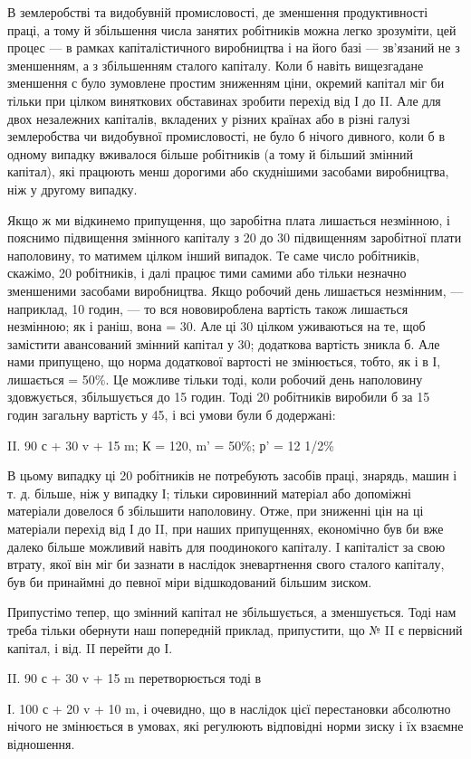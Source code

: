 В землеробстві та видобувній промисловості, де зменшення
продуктивності праці, а тому й збільшення числа занятих робітників
можна легко зрозуміти, цей процес — в рамках капіталістичного
виробництва і на його базі — зв’язаний не з зменшенням,
а з збільшенням сталого капіталу. Коли б навіть вищезгадане
зменшення с було зумовлене простим зниженням ціни,
окремий капітал міг би тільки при цілком виняткових обставинах
зробити перехід від І до II. Але для двох незалежних капіталів,
вкладених у різних країнах або в різні галузі землеробства чи
видобувної промисловості, не було б нічого дивного, коли б
в одному випадку вживалося більше робітників (а тому й більший
змінний капітал), які працюють менш дорогими або скуднішими
засобами виробництва, ніж у другому випадку.

Якщо ж ми відкинемо припущення, що заробітна плата лишається
незмінною, і пояснимо підвищення змінного капіталу
з 20 до 30 підвищенням заробітної плати наполовину, то матимем
цілком інший випадок. Те саме число робітників, скажімо,
20 робітників, і далі працює тими самими або тільки незначно
зменшеними засобами виробництва. Якщо робочий день лишається
незмінним, — наприклад, 10 годин, — то вся нововироблена
вартість також лишається незмінною; як і раніш, вона = 30.
Але ці 30 цілком уживаються на те, щоб замістити авансований
змінний капітал у 30; додаткова вартість зникла б. Але нами
припущено, що норма додаткової вартості не змінюється, тобто,
як і в І, лишається = 50\%. Це можливе тільки тоді, коли робочий
день наполовину здовжується, збільшується до 15 годин.
Тоді 20 робітників виробили б за 15 годин загальну вартість
у 45, і всі умови були б додержані:

II. 90 с + 30 v + 15 m; К = 120, m' = 50\%; р' = 12 1/2\%

В цьому випадку ці 20 робітників не потребують засобів
праці, знарядь, машин і т. д. більше, ніж у випадку І; тільки
сировинний матеріал або допоміжні матеріали довелося б збільшити
наполовину. Отже, при зниженні цін на ці матеріали
перехід від І до II, при наших припущеннях, економічно був би
вже далеко більше можливий навіть для поодинокого капіталу.
I капіталіст за свою втрату, якої він міг би зазнати в наслідок
зневартнення свого сталого капіталу, був би принаймні до певної
міри відшкодований більшим зиском.

Припустімо тепер, що змінний капітал не збільшується,
а зменшується. Тоді нам треба тільки обернути наш попередній
приклад, припустити, що № II є первісний капітал, і від.
II перейти до І.

II. 90 с + 30 v + 15 m перетворюється тоді в

І. 100 с + 20 v + 10 m, і очевидно, що в наслідок цієї перестановки
абсолютно нічого не змінюється в умовах, які регулюють
відповідні норми зиску і їх взаємне відношення.
